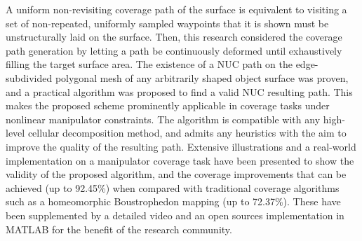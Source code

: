 \documentclass[lettersize,journal]{IEEEtran}
\begin{document}
A uniform non-revisiting coverage path of the surface is equivalent to visiting a set of non-repeated, uniformly sampled waypoints that it is shown must be unstructurally laid on the surface.  
Then, this research considered the coverage path generation by letting a path 
be continuously deformed until exhaustively filling the target surface area. 
The existence of a NUC path on the edge-subdivided polygonal mesh of any arbitrarily 
shaped object surface was proven, and a practical algorithm was proposed to find a valid NUC resulting path. 
This makes the proposed scheme prominently applicable in coverage tasks under nonlinear manipulator constraints. 
The algorithm is compatible with any high-level cellular decomposition method, and admits any heuristics with the aim to improve the quality of the resulting path. 
Extensive illustrations and a real-world implementation on a manipulator coverage task have been presented to show the validity of the proposed algorithm, and the coverage improvements that can be achieved (up to 92.45\%) when compared with traditional coverage algorithms such as a homeomorphic Boustrophedon mapping (up to 72.37\%). 
These have been supplemented by a detailed video and an open sources implementation in MATLAB for the benefit of the research community. 



\vfill
\end{document}
